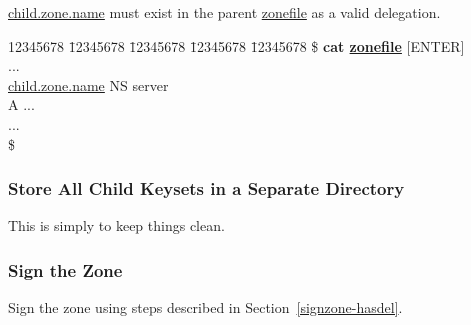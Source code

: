\underline{child.zone.name} must exist in the parent \underline{zonefile}
as a valid delegation.
\begin{tabbing}
\hspace{0.5in} 12345678 \= 12345678 \= 12345678 \= 12345678 \= 12345678 \kill
\hspace{0.5in}\$ {\bf cat \underline{zonefile}} $[$ENTER$]$ \\
\hspace{0.5in} ... \\
\hspace{0.5in} \underline{child.zone.name} \> \> NS \> server \\
\hspace{0.5in} \> \> A \> ... \\
\hspace{0.5in} ... \\
\hspace{0.5in}\$ \\
\end{tabbing}


\subsubsection{Store All Child Keysets in a Separate Directory}

This is simply to keep things clean.


\subsubsection{Sign the Zone}

Sign the zone using steps described in Section~\ref{signzone-hasdel}.




